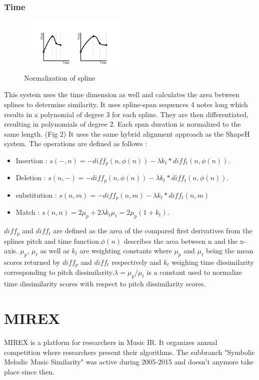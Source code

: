 \documentclass{llncs}
\begin{document}
\begin{itemize}
		\subsubsection{Time}
        \begin{figure}[h!]
			\centering
		  \includegraphics[width=200px,height=100px,keepaspectratio]{two_of_five_point_one}
			\caption{Normalization of spline \cite{five_point_two}}
        \end{figure}
        This system uses the time dimension as well and calculates the area between splines to determine similarity. It uses spline-span sequences 4 notes long which results in a polynomial of degree 3 for each spline. They are then differentiated, resulting in polynomials of degree 2. Each span duration is normalized to the same length. (Fig 2)
        It uses the same hybrid alignment approach as the ShapeH system. 
		The operations are defined as follows : 
        \begin{itemize}
         \item Insertion : 
        $ s(-,n) = -diff _p(n, \phi(n)) - \lambda k_t * diff_t(n, \phi(n)).$
        \item Deletion : 
         $s(n,-) = -diff_p(n, \phi(n)) - \lambda k_t * diff_t (n, \phi(n)).$
       \item substitution : 
       $s(n,m) = - diff_p (n,m) - \lambda k_t * diff_t (n,m) $
       \item Match : 
        $s(n,n) = 2\mu_p + 2\lambda k_t \mu_t = 2\mu_p (1+k_t).$
        \end{itemize}
        
        $diff_p$ and $diff_t$ are defined as the area of the compared first derivatives from the splines pitch and time function.$ \phi(n)$ describes the area between n and the x-axis. $\mu_p$, $\mu_t$ as well as $k_t$ are weighting constants where $\mu_p$ and $\mu_t$ being the mean scores returned by $diff_p$ and $diff_t$ respectively and $k_t$ weighing time dissimilarity corresponding to pitch dissimilarity.$ \lambda = \mu_p / \mu_t$ is a constant used to normalize time dissimilarity scores with respect to pitch dissimilarity scores.
        
	\section{MIREX}
		MIREX is a platform for researchers in Music IR. It organizes annual competition where researchers present their algorithms. The subbranch "Symbolic Melodic Music Similarity" was active during 2005-2015 and doesn't anymore take place since then. 


\end{itemize}
\end{document}
